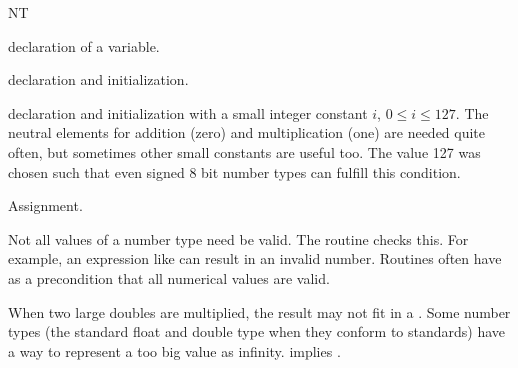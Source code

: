 \begin{class} {NT}
\creation
{}

	    {declaration of a variable.}


	    {declaration and initialization.}


	    {declaration and initialization with a small integer
constant $i$, $0 \leq i \leq 127$. The neutral elements for addition
(zero) and multiplication (one) are needed quite often, but sometimes
other small constants are useful too. The value 127 was chosen such
that even signed 8 bit number types can fulfill this condition.  }

\operations
\threecolumns{2cm}{4cm}
        {Assignment. 
}


{Not all values of a number type need be valid. The routine
 checks this. For example, an expression like
 can result in an invalid number. Routines often
have as a precondition that all numerical values are valid.}

{ When two large doubles are multiplied, the result may not fit in a
  . Some number types (the standard float and double type
  when they conform to standards) have a way to represent a too big
  value as infinity.   implies
  .}

       {}

       {}

       {}


       {}


       {}


       {}

       {}

       {}

       {}


\end{class}

